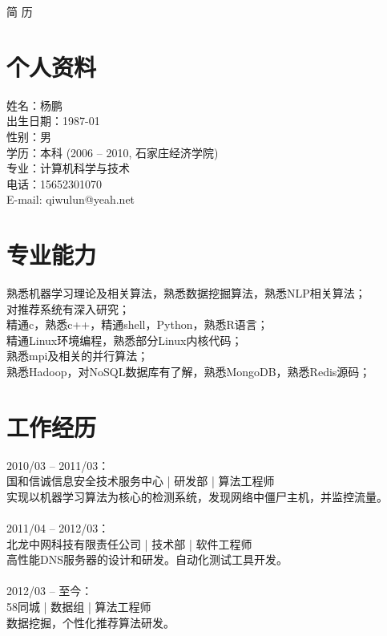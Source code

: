 \documentclass[11pt, a4paper]{article}
\begin{document}
\begin{center}
    \Huge{简{ }{ }历}       %
\end{center}





\section*{个人资料}         %

姓名：杨鹏 \\
出生日期：1987-01 \\
性别：男 \\
学历：本科 (2006 -- 2010, 石家庄经济学院) \\
专业：计算机科学与技术 \\
电话：\mbox{15652301070} \\
E-mail: qiwulun@yeah.net \\





\section*{专业能力}

熟悉机器学习理论及相关算法，熟悉数据挖掘算法，熟悉NLP相关算法； \\
对推荐系统有深入研究； \\
精通c，熟悉c++，精通shell，Python，熟悉R语言； \\
精通Linux环境编程，熟悉部分Linux内核代码； \\
熟悉mpi及相关的并行算法； \\
熟悉Hadoop，对NoSQL数据库有了解，熟悉MongoDB，熟悉Redis源码； \\






\section*{工作经历}

2010/03 -- 2011/03： \\
国和信诚信息安全技术服务中心 | 研发部 | 算法工程师 \\
实现以机器学习算法为核心的检测系统，发现网络中僵尸主机，并监控流量。 \\
\\
2011/04 -- 2012/03： \\
北龙中网科技有限责任公司 | 技术部 | 软件工程师 \\
高性能DNS服务器的设计和研发。自动化测试工具开发。 \\
\\
2012/03 -- 至今： \\
58同城 | 数据组 | 算法工程师 \\
数据挖掘，个性化推荐算法研发。 \\
\end{document}
